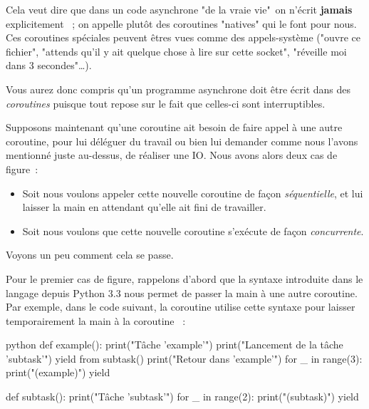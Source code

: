 \documentclass[small]{zmdocument}
\begin{document}
Cela veut dire que dans un code asynchrone "de la vraie vie" on n’écrit \textbf{jamais} explicitement  ; on appelle plutôt des coroutines "natives" qui le font pour nous. Ces coroutines spéciales peuvent êtres vues comme des appels-système ("ouvre ce fichier", "attends qu’il y ait quelque chose à lire sur cette socket", "réveille moi dans 3 secondes"…).





Vous aurez donc compris qu’un programme asynchrone doit être écrit dans des \textit{coroutines} puisque tout repose sur le fait que celles-ci sont interruptibles.



Supposons maintenant qu’une coroutine ait besoin de faire appel à une autre coroutine, pour lui déléguer du travail ou bien lui demander comme nous l’avons mentionné juste au-dessus, de réaliser une IO. Nous avons alors deux cas de figure :



\begin{itemize}
\item\relax Soit nous voulons appeler cette nouvelle coroutine de façon \textit{séquentielle}, et lui laisser la main en attendant qu’elle ait fini de travailler.
\item\relax Soit nous voulons que cette nouvelle coroutine s’exécute de façon \textit{concurrente}.
\end{itemize}


Voyons un peu comment cela se passe.





Pour le premier cas de figure, rappelons d’abord que la syntaxe 
introduite dans le langage depuis Python 3.3 nous permet de passer la main
à une autre coroutine. Par exemple, dans le code suivant, la coroutine
 utilise cette syntaxe pour laisser temporairement la main à la
coroutine  :



\begin{CodeBlock}{python}
def example():
    print("Tâche 'example'")
    print("Lancement de la tâche 'subtask'")
    yield from subtask()
    print("Retour dans 'example'")
    for _ in range(3):
        print("(example)")
        yield

def subtask():
    print("Tâche 'subtask'")
    for _ in range(2):
        print("(subtask)")
        yield
\end{CodeBlock}
\end{document}
